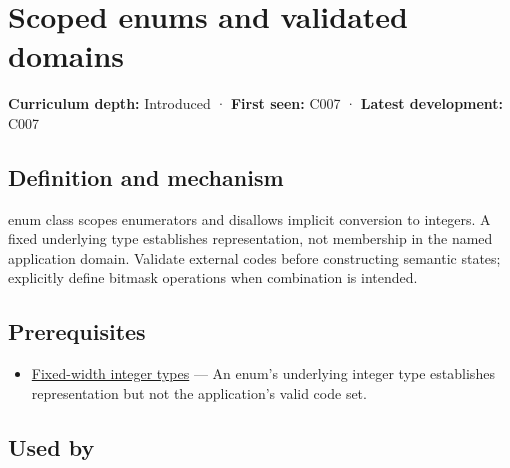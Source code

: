 \hypertarget{appendix-23640fcee147}{}\label{referencestart:appendix-23640fcee147}
\section{Scoped enums and validated domains}\label{appendix-23640fcee147-scoped-enums-and-validated-domains}

\hypertarget{appendix-23640fcee147-scoped-enums-and-validated-domains}{}

\textbf{Curriculum depth:} Introduced · \textbf{First seen:} C007 · \textbf{Latest development:} C007

\begin{allmightroledefinition}

\subsection{Definition and mechanism}\label{appendix-23640fcee147-definition-and-mechanism}

\hypertarget{appendix-23640fcee147-definition-and-mechanism}{}

enum class scopes enumerators and disallows implicit conversion to integers. A fixed underlying type establishes representation, not membership in the named application domain. Validate external codes before constructing semantic states; explicitly define bitmask operations when combination is intended.

\end{allmightroledefinition}

\subsection{Prerequisites}\label{appendix-23640fcee147-prerequisites}

\hypertarget{appendix-23640fcee147-prerequisites}{}

\begin{itemize}
\tightlist
\item
  \hyperref[appendix-cc04044b5782]{Fixed-width integer types} --- An enum's underlying integer type establishes representation but not the application's valid code set.
\end{itemize}

\subsection{Used by}\label{appendix-23640fcee147-used-by}

